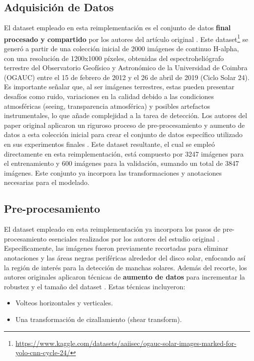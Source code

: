 \documentclass[journal]{IEEEtran}
\begin{document}
\subsection{Adquisición de Datos}
El dataset empleado en esta reimplementación es el conjunto de datos \textbf{final procesado y compartido} por los autores del artículo original \cite{Santos2023}. Este dataset\footnote{\url{https://www.kaggle.com/datasets/aaiisec/ogauc-solar-images-marked-for-yolo-cnn-cycle-24/}} se generó a partir de una colección inicial de 2000 imágenes de continuo H-alpha, con una resolución de 1200x1000 píxeles, obtenidas del espectroheliógrafo terrestre del Observatorio Geofísico y Astronómico de la Universidad de Coimbra (OGAUC) entre el 15 de febrero de 2012 y el 26 de abril de 2019 (Ciclo Solar 24). Es importante señalar que, al ser imágenes terrestres, estas pueden presentar desafíos como ruido, variaciones en la calidad debido a las condiciones atmosféricas (seeing, transparencia atmosférica) y posibles artefactos instrumentales, lo que añade complejidad a la tarea de detección. Los autores del paper original aplicaron un riguroso proceso de pre-procesamiento y aumento de datos a esta colección inicial para crear el conjunto de datos específico utilizado en sus experimentos finales \cite{Santos2023}. Este dataset resultante, el cual se empleó directamente en esta reimplementación, está compuesto por 3247 imágenes para el entrenamiento y 600 imágenes para la validación, sumando un total de 3847 imágenes. Este conjunto ya incorpora las transformaciones y anotaciones necesarias para el modelado.
\subsection{Pre-procesamiento}


El dataset empleado en esta reimplementación ya incorpora los pasos de pre-procesamiento esenciales realizados por los autores del estudio original \cite{Santos2023}. Específicamente, las imágenes fueron previamente recortadas para eliminar anotaciones y las áreas negras periféricas alrededor del disco solar, enfocando así la región de interés para la detección de manchas solares. Además del recorte, los autores originales aplicaron técnicas de \textbf{aumento de datos} para incrementar la robustez y el tamaño del dataset \cite{Santos2023}. Estas técnicas incluyeron:
\begin{itemize}
    \item Volteos horizontales y verticales.
    \item Una transformación de cizallamiento (shear transform).
\end{itemize}
\end{document}

